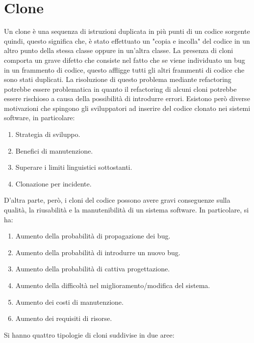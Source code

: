 \section{Clone}
Un clone è una sequenza di istruzioni duplicata in più punti di un codice sorgente quindi, questo significa che, è stato effettuato un "copia e incolla" del codice in un altro punto della stessa classe oppure in un'altra classe. La presenza di cloni comporta un grave difetto che consiste nel fatto che se viene individuato un bug in un frammento di codice, questo affligge tutti gli altri frammenti di codice che sono stati duplicati. La risoluzione di questo problema mediante refactoring potrebbe essere problematica in quanto il refactoring di alcuni cloni potrebbe essere rischioso a causa della possibilità di introdurre errori. Esistono però diverse motivazioni che spingono gli sviluppatori ad inserire del codice clonato nei sistemi software, in particolare:
\begin{enumerate}
\item	Strategia di sviluppo.
\item	Benefici di manutenzione.
\item	Superare i limiti linguistici sottostanti.
\item	Clonazione per incidente.
\end{enumerate}
D'altra parte, però, i cloni del codice possono avere gravi conseguenze sulla qualità, la riusabilità e la manutenibilità di un sistema software. In particolare, si ha:
\begin{enumerate}
\item	Aumento della probabilità di propagazione dei bug.
\item	Aumento della probabilità di introdurre un nuovo bug.
\item	Aumento della probabilità di cattiva progettazione.
\item	Aumento della difficoltà nel miglioramento/modifica del sistema.
\item	Aumento dei costi di manutenzione.
\item	Aumento dei requisiti di risorse.
\end{enumerate}
Si hanno quattro tipologie di cloni suddivise in due aree:
